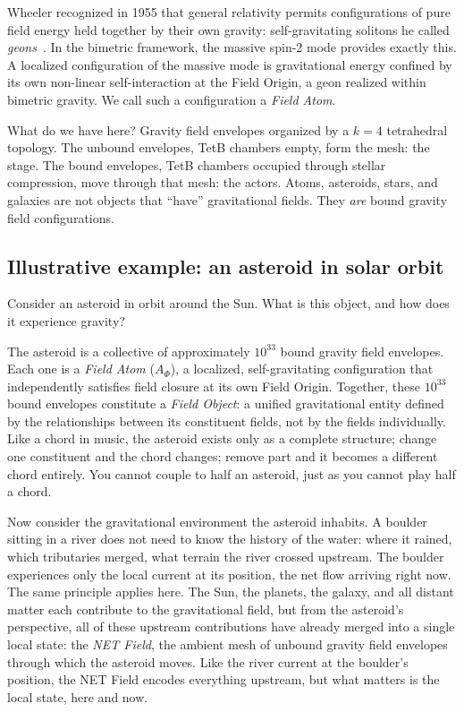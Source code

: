 \documentclass[aps,prd,preprint,superscriptaddress,showpacs,preprintnumbers,amsmath,amssymb,nofootinbib]{revtex4-2}
\begin{document}
Wheeler recognized in 1955 that general relativity permits configurations of pure field energy held together by their own gravity: self-gravitating solitons he called \emph{geons}~\cite{wheeler1955}. In the bimetric framework, the massive spin-2 mode provides exactly this. A localized configuration of the massive mode is gravitational energy confined by its own non-linear self-interaction at the Field Origin, a geon realized within bimetric gravity. We call such a configuration a \emph{Field Atom}.

What do we have here? Gravity field envelopes organized by a $k = 4$ tetrahedral topology. The unbound envelopes, TetB chambers empty, form the mesh: the stage. The bound envelopes, TetB chambers occupied through stellar compression, move through that mesh: the actors. Atoms, asteroids, stars, and galaxies are not objects that ``have'' gravitational fields. They \emph{are} bound gravity field configurations.

\subsection{Illustrative example: an asteroid in solar orbit}
\label{subsec:asteroid}

Consider an asteroid in orbit around the Sun. What is this object, and how does it experience gravity?

The asteroid is a collective of approximately $10^{33}$ bound gravity field envelopes. Each one is a \emph{Field Atom} ($A_\Phi$), a localized, self-gravitating configuration that independently satisfies field closure at its own Field Origin. Together, these $10^{33}$ bound envelopes constitute a \emph{Field Object}: a unified gravitational entity defined by the relationships between its constituent fields, not by the fields individually. Like a chord in music, the asteroid exists only as a complete structure; change one constituent and the chord changes; remove part and it becomes a different chord entirely. You cannot couple to half an asteroid, just as you cannot play half a chord.

Now consider the gravitational environment the asteroid inhabits. A boulder sitting in a river does not need to know the history of the water: where it rained, which tributaries merged, what terrain the river crossed upstream. The boulder experiences only the local current at its position, the net flow arriving right now. The same principle applies here. The Sun, the planets, the galaxy, and all distant matter each contribute to the gravitational field, but from the asteroid's perspective, all of these upstream contributions have already merged into a single local state: the \emph{NET Field}, the ambient mesh of unbound gravity field envelopes through which the asteroid moves. Like the river current at the boulder's position, the NET Field encodes everything upstream, but what matters is the local state, here and now.
\end{document}
